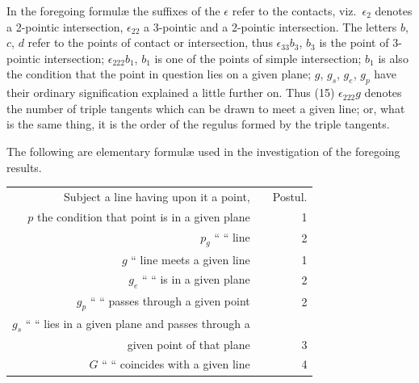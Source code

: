 \documentclass[11pt,a4paper]{book}
\begin{document}
In the foregoing formul\ae{} the suffixes of the $\epsilon$ refer to the contacts, viz.\ $\epsilon_2$ denotes a 2-pointic intersection, $\epsilon_{22}$ a 3-pointic and a 2-pointic intersection. The letters $b$, $c$, $d$ refer to the points of contact or intersection, thus $\epsilon_{33}b_3$, $b_3$ is the point of 3-pointic intersection; $\epsilon_{222}b_1$, $b_1$ is one of the points of simple intersection; $b_1$ is also the condition that the point in question lies on a given plane; $g$, $g_s$, $g_e$, $g_p$ have their ordinary signification explained a little further on. Thus (15) $\epsilon_{222}g$ denotes the number of triple tangents which can be drawn to meet a given line; or, what is the same thing, it is the order of the regulus formed by the triple tangents.

The following are elementary formul\ae{} used in the investigation of the foregoing results.

\begin{center}
\begin{tabular}{r @{\quad} l @{\qquad} r}
Subject a line having upon it a point, & & Postul. \\[2pt]
$p$ the condition that point is in a given plane & & 1 \\
$p_g$ \hspace{2em} `` \hspace{3em} `` \hspace{3em} line & & 2 \\
$g$ \hspace{2em} `` \hspace{1.5em} line meets a given line & & 1 \\
$g_e$ \hspace{2em} `` \hspace{3em} `` \hspace{1.5em} is in a given plane & & 2 \\
$g_p$ \hspace{2em} `` \hspace{3em} `` \hspace{1.5em} passes through a given point & & 2 \\
$g_s$ \hspace{2em} `` \hspace{3em} `` \hspace{1.5em} lies in a given plane and passes through a & & \\
\hspace{2em} given point of that plane & & 3 \\
$G$ \hspace{2em} `` \hspace{3em} `` \hspace{1.5em} coincides with a given line & & 4 \\[4pt]
\end{tabular}
\end{center}
\end{document}
